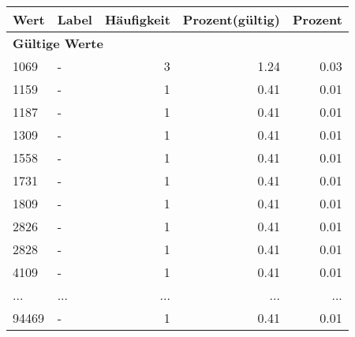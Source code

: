      \begin{longtable}{lXrrr}
     \toprule
     \textbf{Wert} & \textbf{Label} & \textbf{Häufigkeit} & \textbf{Prozent(gültig)} & \textbf{Prozent} \\
     \endhead
     \midrule
     \multicolumn{5}{l}{\textbf{Gültige Werte}}\\
        1069 & \multicolumn{1}{X}{-} & %
          \num{3} &
          \num[round-mode=places,round-precision=2]{1.24} &
          \num[round-mode=places,round-precision=2]{0.03} \\
        1159 & \multicolumn{1}{X}{-} & %
          \num{1} &
          \num[round-mode=places,round-precision=2]{0.41} &
          \num[round-mode=places,round-precision=2]{0.01} \\
        1187 & \multicolumn{1}{X}{-} & %
          \num{1} &
          \num[round-mode=places,round-precision=2]{0.41} &
          \num[round-mode=places,round-precision=2]{0.01} \\
        1309 & \multicolumn{1}{X}{-} & %
          \num{1} &
          \num[round-mode=places,round-precision=2]{0.41} &
          \num[round-mode=places,round-precision=2]{0.01} \\
        1558 & \multicolumn{1}{X}{-} & %
          \num{1} &
          \num[round-mode=places,round-precision=2]{0.41} &
          \num[round-mode=places,round-precision=2]{0.01} \\
        1731 & \multicolumn{1}{X}{-} & %
          \num{1} &
          \num[round-mode=places,round-precision=2]{0.41} &
          \num[round-mode=places,round-precision=2]{0.01} \\
        1809 & \multicolumn{1}{X}{-} & %
          \num{1} &
          \num[round-mode=places,round-precision=2]{0.41} &
          \num[round-mode=places,round-precision=2]{0.01} \\
        2826 & \multicolumn{1}{X}{-} & %
          \num{1} &
          \num[round-mode=places,round-precision=2]{0.41} &
          \num[round-mode=places,round-precision=2]{0.01} \\
        2828 & \multicolumn{1}{X}{-} & %
          \num{1} &
          \num[round-mode=places,round-precision=2]{0.41} &
          \num[round-mode=places,round-precision=2]{0.01} \\
        4109 & \multicolumn{1}{X}{-} & %
          \num{1} &
          \num[round-mode=places,round-precision=2]{0.41} &
          \num[round-mode=places,round-precision=2]{0.01} \\
       ... & ... & ... & ... & ... \\
        94469 & \multicolumn{1}{X}{-} & %
          \num{1} &
          \num[round-mode=places,round-precision=2]{0.41} &
          \num[round-mode=places,round-precision=2]{0.01} \\


\end{longtable}
